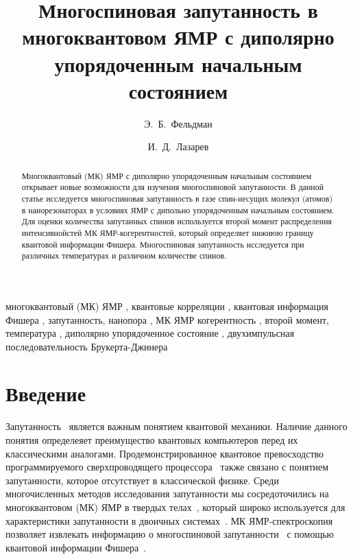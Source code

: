 \documentclass[review]{elsarticle}
\begin{document}
\begin{frontmatter}

\title{Многоспиновая запутанность в многоквантовом ЯМР с диполярно упорядоченным начальным состоянием}

\author[icp]{Э.~Б.~Фельдман}
\author[icp,msu]{И.~Д.~Лазарев} %

\address[icp]{Институт проблем химической физики РАН, \\ Черноголовка, Московская область, Россия 142432}
\address[msu]{Факультет фундаментальной физико-химической инженерии, МГУ GSP-1, Москва, Россия 119991}



\begin{abstract}
Многоквантовый (МК)  ЯМР с диполярно упорядоченным начальным состоянием открывает новые возможности для изучения многоспиновой запутанности. 
В данной статье исследуется многоспиновая запутанность в газе спин-несущих молекул (атомов) в нанорезонаторах
в условиях ЯМР с дипольно упорядоченным начальным состоянием.
Для оценки количества запутанных спинов используется второй момент распределения интенсивнойстей МК ЯМР-когерентностей, 
который определяет нижнюю границу квантовой информации Фишера. 
Многоспиновая запутанность исследуется при различных температурах и различном количестве спинов.
\end{abstract}

\begin{keyword}
многоквантовый (МК) ЯМР \sep  
квантовые корреляции \sep 
квантовая информация Фишера \sep 
запутанность, нанопора \sep 
МК ЯМР когерентность \sep 
второй момент, температура \sep 
диполярно упорядоченное состояние \sep 
двухимпульсная последовательность Брукерта-Джинера
\end{keyword}

\end{frontmatter}


\section{Введение}
\label{sec:1}

Запутанность~\cite{Nielsen_2009} является важным понятием квантовой механики. Наличие данного понятия определеяет преимущество квантовых компьютеров перед их классическими аналогами. 
Продемонстрированное квантовое превосходство программируемого сверхпроводящего процессора~\cite{Arute2019} также связано с понятием запутанности, которое отсутствует в классической физике.
Среди многочисленных методов исследования запутанности мы сосредоточились на многоквантовом (МК) ЯМР в твердых телах~\cite{Baum_1985}, который широко используется для характеристики запутанности в двоичных системах~\cite{Furman_2008, Furman_2009, Fel_dman_2008, Fel_dman_2012}.
МК ЯМР-спектроскопия~\cite{Baum_1985} позволяет извлекать информацию о многоспиновой запутанности~\cite{G_rttner_2018} с помощью квантовой информации Фишера~\cite{T_th_2014, Pezz__2018}.
\end{document}
